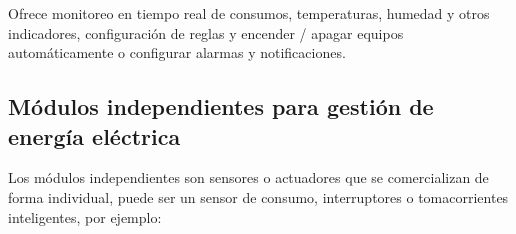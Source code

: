 \begin{itemize}

Ofrece monitoreo en tiempo real de consumos, temperaturas, humedad y otros indicadores, configuración de reglas y encender / apagar equipos automáticamente o configurar alarmas y notificaciones.
\end{itemize}
\subsection{Módulos independientes para gestión de energía eléctrica}
Los módulos independientes son sensores o actuadores  que se comercializan de forma individual, puede ser un sensor de consumo, interruptores o tomacorrientes inteligentes, por ejemplo: 
